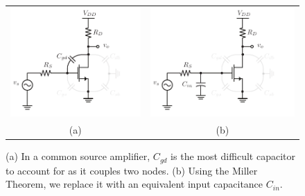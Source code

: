 \begin{figure}[tb]
\begin{center}
\begin{tabular}{cc}
\includegraphics[scale=1]{cs_amp_cgd} &
\includegraphics[scale=1]{cs_amp_cgd_miller} \\
(a) & (b) \\
\end{tabular}
\end{center}
\caption{(a) In a common source amplifier, $C_{gd}$ is the most difficult capacitor to account for as it couples two nodes.  (b) Using the Miller Theorem, we replace it with an equivalent input capacitance $C_{in}$. } \label{fig:cs_amp_cgd}
\end{figure}


